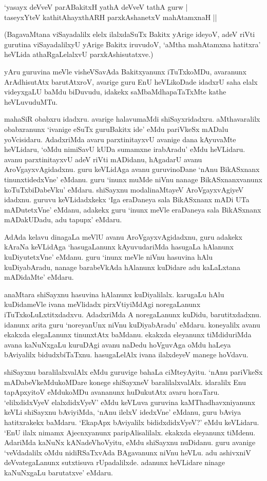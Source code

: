 \begin{shloka} 
`yasayx deVveV parABakitxH yathA deVveV tathA gurw |\\
taseyxYteV kathitAhayxthARH parxkAshanetxV mahAtamxnaH ||
\end{shloka}

(BagavaMtana viSayadalilx elelx ilalxdaSuTx Bakitx yArige ideyoV, adeV riVti gurutina viSayadalilxyU yArige Bakitx iruvudoV, `aMtha mahAtamxna hatitxra' heVLida athaRgaLelalxvU parxkAshisutatxve.)

yAru guruvina meVle visheVSavAda Bakitxyanunx iTuTxkoMDu, avaranunx ArAdhisutAtx barutAtxroV, avarige guru EnU heVLikoDade idadxrU saha elalx videyxgaLU baMdu biDuvudu, idakekx saMbaMdhapaTaTxMte kathe heVLuvuduMTu. 

mahaSiR obabxru idadxru. avarige halavumaMdi shiSayxridadxru. aMthavaralilx obabxranunx `ivanige eSuTx guruBakitx ide' eMdu pariVkeSx mADalu yoVcisidaru. AdadxriMda avaru parxtinitayxvU avanige dana kAyuvaMte heVLidaru, `oMdu nimiSavU kUDa sumamxne irabAradu' eMdu heVLidaru. avanu parxtinitayxvU adeV riVti mADidanu, hAgadarU avanu AroVgayxvAgidadxnu. guru keVLidAga avanu guruvinoDane `nAnu BikASxnanx tinunxtidedxVne' eMdanu. guru `inunx muMde niVnu nanage BikASxnanxvanunx koTuTxbiDabeVku' eMdaru. shiSayxnu modalinaMtayeV AroVgayxvAgiyeV idadxnu. guruvu keVLidadxkekx `Iga eraDaneya sala BikASxnanx mADi UTa mADutetxVne' eMdanu, adakekx guru `inunx meVle eraDaneya sala BikASxnanx mADakUDadu, adu tapupx' eMdaru. 


AdAda kelavu dinagaLa meVlU avanu AroVgayxvAgidadxnu, guru adakekx kAraNa keVLidAga `hasugaLanunx kAyuvudariMda hasugaLa hAlanunx kuDiyutetxVne' eMdanu. guru `inunx meVle niVnu hasuvina hAlu kuDiyabAradu, nanage barabeVkAda hAlanunx kuDidare adu kaLaLxtana mADidaMte' eMdaru. 


anaMtara shiSayxnu hasuvina hAlanunx kuDiyalilalx. karugaLu hAlu kuDidameVle ivana meVlidadx pirxVtiyiMdAgi noregaLanunx iTuTxkoLuLxtitxdadxvu. AdadxriMda A noregaLanunx kuDidu, barutitxdadxnu. idanunx arita guru `noreyanUnx niVnu kuDiyabAradu' eMdaru. koneyalilx avanu ekakxda elegaLanunx tinunxtAtx baMdanu. ekakxda eleyanunx tiMdiduriMda avana kaNuNxgaLu kuruDAgi avanu naDedu hoVguvAga oMdu haLeya bAviyalilx bidudxbiTaTxnu. hasugaLelAlx ivana ilalxdeyeV manege hoVdavu. 

shiSayxnu baralilalxvalAlx eMdu guruvige bahaLa ciMteyAyitu. `nAnu pariVkeSx mADabeVkeMdukoMDare konege shiSayxneV baralilalxvalAlx. idaralilx Enu tapApxyitoV eMdukoMDu avananunx huDukutAtx avaru horaTaru. `elilxdidxVyeV elalxdidxVyeV' eMdu keVLuva guruvina kaMThadhavxniyanunx keVLi shiSayxnu bAviyiMda, `nAnu ilelxV idedxVne' eMdanu, guru bAviya hatitxrakekx baMdaru. `EkapApx bAviyalilx bididxdidxVyeV?' eMdu keVLidaru. `EnU ilalx nimamx Ajecnxyanunx paripAlisalilalx. ekakxda eleyanunx tiMdenu. AdariMda kaNuNx kANadeVhoVyitu, eMdu shiSayxnu nuDidanu. guru avanige `veVdadalilx oMdu nidiRSaTxvAda BAgavanunx niVnu heVLu. adu ashivxniV deVvategaLanunx sutxtisuva rUpadalilxde. adanunx heVLidare ninage kaNuNxgaLu barutatxve' eMdaru. 

